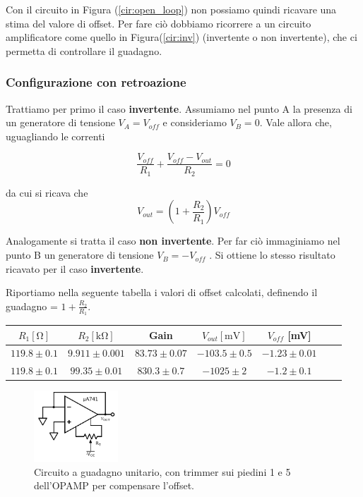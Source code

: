Con il circuito in Figura (\ref{cir:open_loop}) non possiamo quindi ricavare una stima del valore di offset. Per fare ciò dobbiamo ricorrere a un circuito amplificatore come quello in Figura(\ref{cir:inv}) (invertente o non invertente), che ci permetta di controllare il guadagno.

\subsubsection{Configurazione con retroazione}

Trattiamo per primo il caso \textbf{invertente}. Assumiamo nel punto A la presenza di un generatore di tensione $V_A=V_{off}$ e consideriamo $V_B=0$. Vale allora che, uguagliando le correnti

$$\frac{V_{off}}{R_1} + \frac{V_{off}-V_{out}}{R_2} = 0$$

da cui si ricava che
$$V_{out}=\left(1+\frac{R_2}{R_1}\right) V_{off}$$

Analogamente si tratta il caso \textbf{non invertente}. Per far ciò immaginiamo nel punto B un generatore di tensione $V_B=-V_{off}$ . Si ottiene lo stesso risultato ricavato per il caso \textbf{invertente}.


Riportiamo nella seguente tabella i valori di offset calcolati, definendo il guadagno = $1+\frac{R_2}{R_1}$. 

\begin{center}
\begin{savenotes}
\begin{tabular}{c|c|c|c|c|c|c}
$R_1[\si{\ohm}]$ & $R_2[\si{\kilo\ohm}]$ & Gain &$V_{out} [\si{\milli\volt}]$ & $V_{off}$ [\si{\milli\volt}]\\ 
\hline 
$119.8\pm0.1$ & $9.911\pm0.001$ & $83.73\pm0.07$&  $-103.5 \pm 0.5$ & $-1.23 \pm0.01$\\
\hline
$119.8\pm0.1$ & $99.35\pm0.01$ & $830.3\pm0.7$ &$ -1025 \pm 2$ & $-1.2 \pm0.1$\\

\end{tabular}
\end{savenotes}
\end{center}

\begin{figure}
  \begin{center}
    \includegraphics[width=0.280\textwidth]{../E02/latex/trimmer_correction.pdf}
  \end{center}
  \caption{Circuito a guadagno unitario, con trimmer sui piedini 1 e 5 dell'OPAMP per compensare l'offset.}
  \label{cir2:trimmer}
\end{figure}

